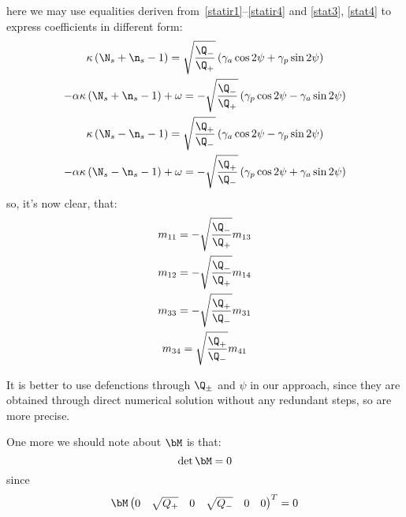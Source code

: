 \documentclass[12pt, notitlepage]{report}
\begin{document}
here we may use equalities deriven from~\eqref{statir1}--\eqref{statir4} and \eqref{stat3}, \eqref{stat4} to express coefficients in different form:
\begin{gather}
	\kappa \left(\N_s + \n_s - 1\right) = \sqrt{\frac{\Q_-}{\Q_+}} \left( \gamma_a  \cos 2\psi + \gamma_p  \sin 2\psi \right) \\
	-\alpha\kappa \left(\N_s+ \n_s - 1\right) + \omega  = -\sqrt{\frac{\Q_-}{\Q_+}} \left(\gamma_p  \cos 2\psi - \gamma_a  \sin 2\psi \right) \\
	\kappa \left(\N_s - \n_s - 1\right) = \sqrt{\frac{\Q_+}{\Q_-}} \left(\gamma_a  \cos 2\psi - \gamma_p \sin 2\psi\right) \\
	-\alpha\kappa \left(\N_s- \n_s - 1\right) + \omega  = -\sqrt{\frac{\Q_+}{\Q_-}} \left(\gamma_p \cos 2\psi + \gamma_a  \sin 2\psi\right)
\end{gather}
so, it's now clear, that:
\begin{gather*}
	m_{11} = -\sqrt{\frac{\Q_-}{\Q_+}}m_{13} \\
	m_{12} = -\sqrt{\frac{\Q_-}{\Q_+}}m_{14} \\
	m_{33} = -\sqrt{\frac{\Q_+}{\Q_-}}m_{31} \\
	m_{34} = \sqrt{\frac{\Q_+}{\Q_-}}m_{41} \\
\end{gather*}

It is better to use defenctions through $\Q_\pm$ and $\psi$ in our approach, since they are obtained through direct numerical solution without any redundant steps, so are more precise.

One more we should note about $\bM$ is that:
\begin{equation}
	\det\bM = 0
\end{equation}
since
\begin{equation}
	\bM \begin{pmatrix}
		0 & \sqrt{Q_+} &  0 & \sqrt{Q_-} & 0 & 0
	\end{pmatrix}^T = 0
\end{equation}
\end{document}
